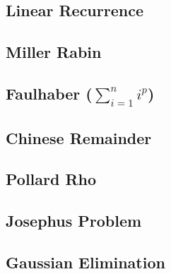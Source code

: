 \documentclass[a4paper,10pt,twocolumn,oneside]{article}
\begin{document}
\subsection{Linear Recurrence}



\subsection{Miller Rabin}


% 

\subsection{Faulhaber ($\sum\limits_{i=1}^{n}i^p$)}


\subsection{Chinese Remainder}


\subsection{Pollard Rho}


\subsection{Josephus Problem}


%

%

\subsection{Gaussian Elimination}

\end{document}
